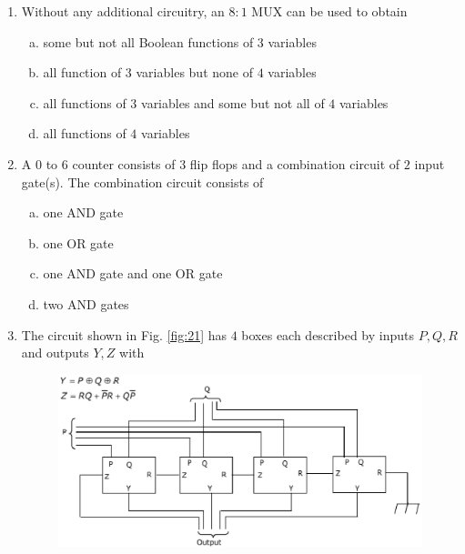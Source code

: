 \documentclass[journal,12pt,twocolumn]{IEEEtran}
\begin{document}
\begin{enumerate}
\begin{enumerate}[(a)]
\begin{figure}
\caption{}

\label{fig:20}

\end{figure} 




\end{enumerate}

\item Without any additional circuitry, an $8:1$ MUX can be used to obtain 


\begin{enumerate}[(a)]
 
\item some but not all Boolean functions of $3$ variables

\item all function of $3$ variables but none of $4$ variables

\item all functions of $3$ variables and some but not all of $4$ variables

\item all functions of $4$ variables

\end{enumerate}


\item A $0$ to $6$ counter consists of $3$ flip flops and a combination circuit of $2$ input gate(s). The combination circuit consists of

\begin{enumerate}[(a)]
 
\item one AND gate

\item one OR gate

\item one AND gate and one OR gate

\item two AND gates

\end{enumerate}

\item The circuit shown in Fig. \ref{fig:21} has $4$ boxes each described by inputs $P,Q,R$ and outputs $Y,Z$ with

\begin{figure}

\centering

\includegraphics[width=\columnwidth]{./figs/25.eps}


\end{figure}
\end{enumerate}
\end{document}
